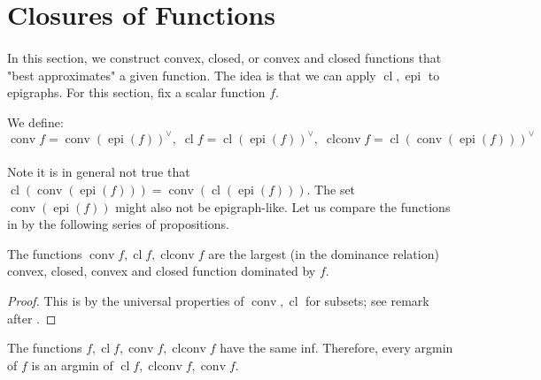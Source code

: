 \section{Closures of Functions}
\label{sect:023}

\paragraph{}In this section, we construct convex, closed, or convex and closed functions that "best approximates" a given function. The idea is that we can apply $\operatorname{cl},\operatorname{epi}$ to epigraphs. For this section, fix a scalar function $f$.

\begin{defn}
	\label{defn:023-closure-funcs}
	We define:
	\[
		\operatorname{conv}f=
		\operatorname{conv}(\operatorname{epi}(f))^\vee,\;
		\operatorname{cl}f=
		\operatorname{cl}(\operatorname{epi}(f))^\vee,\;
		\operatorname{clconv}f=
		\operatorname{cl}(\operatorname{conv} (\operatorname{epi}(f)))^\vee
	\]
\end{defn}
\paragraph{}Note it is in general not true that $\operatorname{cl}(\operatorname{conv} (\operatorname{epi}(f)))=\operatorname{conv}(\operatorname{cl} (\operatorname{epi}(f)))$. The set $\operatorname{conv}(\operatorname{epi}(f))$ might also not be epigraph-like. Let us compare the functions in  by the following series of propositions.

\begin{prop}\label{prop:023-closure-univ}
	The functions $\operatorname{conv}f,\operatorname{cl}f,\operatorname{clconv}f$ are the largest (in the dominance relation) convex, closed, convex and closed function dominated by $f$.
\end{prop}

\begin{proof}
	This is by the universal properties of $\operatorname{conv},\operatorname{cl}$ for subsets; see remark after .
\end{proof}


\begin{prop}[Optimality]
	\label{prop:023-closure-optimality}
	The functions $f,\operatorname{cl}f,\operatorname{conv}f,\operatorname{clconv}f$ have the same inf. Therefore, every argmin of $f$ is an argmin of $\operatorname{cl}f,\operatorname{clconv}f,\operatorname{conv}f$.
\end{prop}

